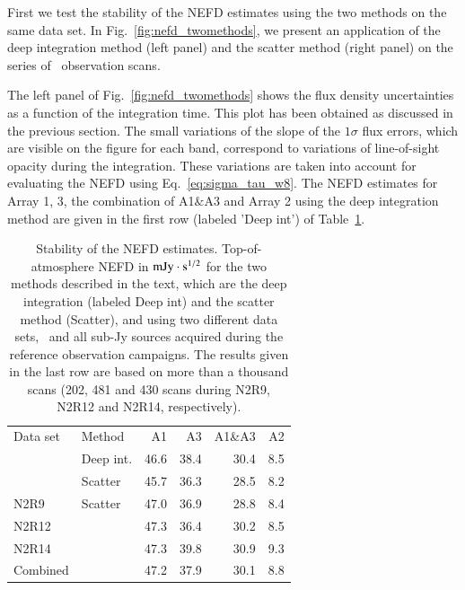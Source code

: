 First we test the stability of the NEFD estimates using the two
methods on the same data set. In Fig.~\ref{fig:nefd_twomethods}, we
present an application of the deep integration method (left panel) and
the scatter method (right panel) on
the series of \hls\ observation scans.

The left panel of Fig.~\ref{fig:nefd_twomethods} shows the flux density
uncertainties as a function of the integration time. This plot has
been obtained as discussed in the previous section. The small
variations of the slope of the $1\sigma$ flux errors, which are
visible on the figure for each band, correspond to variations of line-of-sight opacity
during the integration. These variations are taken into account for
evaluating the NEFD using Eq.~\ref{eq:sigma_tau_w8}. The NEFD estimates for Array 1, 3, the
combination of A1$\&$A3 and Array 2 using the deep  
integration method are given in the first row (labeled 'Deep int') of
Table~\ref{tab:nefd_summary}. 
 
\begin{table}[!htbp]
  \centering
  \caption[]{Stability of the NEFD estimates. Top-of-atmosphere NEFD
    in $\rm{mJy}\cdot s^{1/2}$ for the two methods described in the text, which
  are the deep integration (labeled Deep int) and the scatter method
  (Scatter), and using two different data sets, \hls\
  and all sub-Jy sources acquired during the reference observation
  campaigns. The results given in the last row are based on more than a thousand
  scans (202, 481 and 430 scans during N2R9, N2R12 and N2R14, respectively).}
  \label{tab:nefd_summary}
  \begin{tabular}{llrrrr}
    \hline\hline
    \noalign{\smallskip}
    Data set   & Method   & A1      &   A3    &   A1\&A3 &    A2 \\
    \noalign{\smallskip}
    \hline
    \noalign{\smallskip}
    \hls &     Deep int.  &  46.6  &    38.4  &    30.4  &   8.5  \\
         &     Scatter    &  45.7  &    36.3  &    28.5  &   8.2  \\
    \hline
    \noalign{\smallskip}
    N2R9     & Scatter    & 47.0 &  36.9  & 28.8  & 8.4 \\
    N2R12    &            & 47.3 &  36.4  & 30.2  & 8.5 \\
    N2R14    &            & 47.3 &  39.8  & 30.9  & 9.3 \\
    Combined &            & 47.2 &  37.9  & 30.1  & 8.8 \\
    \hline
  \end{tabular}
\end{table}


